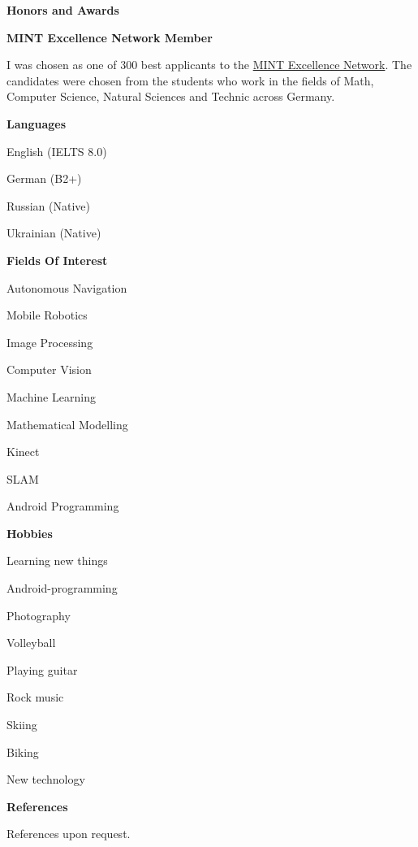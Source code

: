 \documentclass[a4paper,12pt,final]{memoir}
\newcommand{\Sep}{\vspace{1.5em}}
\newcommand{\SmallSep}{\vspace{0.5em}}
\newcommand{\CVSection}[1]
	{\Large\textbf{#1}\par
	\SmallSep\normalsize\normalfont}
\newcommand{\CVItem}[1]
	{\textbf{\color{MidnightBlue} #1}}
\begin{document}
\CVSection{Honors and Awards}
\CVItem{MINT Excellence Network Member}
\begin{compactitem}[\color{MidnightBlue}$\circ$]
	\item I was chosen as one of 300 best applicants to the \href{http://www.mlp.de/#/studenten/karriere/stipendienprogramme/mint-excellence}{MINT Excellence Network}. The candidates were chosen from the students who work in the fields of Math, Computer Science, Natural Sciences and Technic across Germany.
\end{compactitem}
\Sep

\framebreak
\clearpage
\framebreak
\framebreak

\CVSection{Languages}
\begin{compactitem}[\color{MidnightBlue}$\circ$]
	\item English (IELTS 8.0)
	\item German (B2+) 
	\item Russian (Native) 
	\item Ukrainian (Native)
\end{compactitem}
\Sep

\CVSection{Fields Of Interest}
\begin{compactitem}[\color{MidnightBlue}$\circ$]
	\item Autonomous Navigation
	\item Mobile Robotics
	\item Image Processing 
	\item Computer Vision 
	\item Machine Learning
	\item Mathematical Modelling
	\item Kinect 
	\item SLAM
	\item Android Programming
\end{compactitem}
\Sep 

\CVSection{Hobbies}
\begin{compactitem}[\color{MidnightBlue}$\circ$]
	\item Learning new things
	\item Android-programming
	\item Photography
	\item Volleyball
	\item Playing guitar 
	\item Rock music
	\item Skiing
	\item Biking
	\item New technology
\end{compactitem}
\Sep
\CVSection{References}
References upon request.
\clearpage
\framebreak

\end{document}
